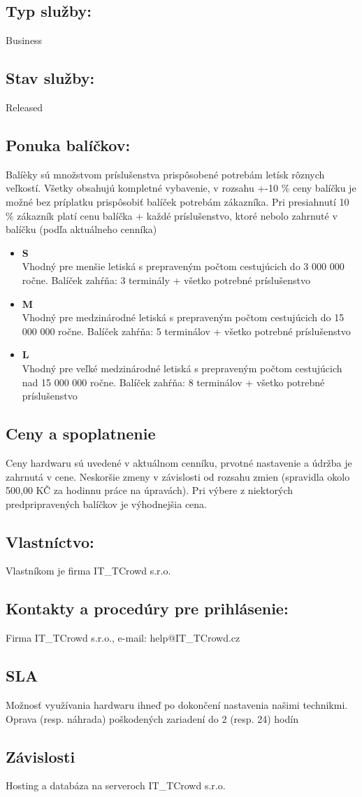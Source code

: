 \documentclass[a4paper, 11pt]{article}
\begin{document}
\subsection*{Typ služby:}
Business
\subsection*{Stav služby:}
Released
\subsection*{Ponuka balíčkov:}
Balíèky sú množstvom príslušenstva prispôsobené potrebám letísk rôznych veľkostí. Všetky obsahujú kompletné vybavenie, v rozsahu +-10 \% ceny balíčku je možné bez príplatku prispôsobiť balíček potrebám zákazníka. Pri presiahnutí 10 \% zákazník platí cenu balíčka + každé príslušenstvo, ktoré nebolo zahrnuté v balíčku (podľa aktuálneho cenníka)
\begin{itemize}
\item \textbf{S} \\
Vhodný pre menšie letiská s prepraveným počtom cestujúcich do 3 000 000 ročne. Balíček zahŕňa: 3 terminály + všetko potrebné príslušenstvo
\item \textbf{M} \\
Vhodný pre medzinárodné letiská s prepraveným počtom cestujúcich do 15 000 000 ročne. Balíček zahŕňa: 5 terminálov + všetko potrebné príslušenstvo
\item \textbf{L} \\
Vhodný pre veľké medzinárodné letiská s prepraveným počtom cestujúcich nad 15 000 000 ročne. Balíček zahŕňa: 8 terminálov + všetko potrebné príslušenstvo
\end{itemize}
\subsection*{Ceny a spoplatnenie}
Ceny hardwaru sú uvedené v aktuálnom cenníku, prvotné nastavenie a údržba je zahrnutá v cene. Neskoršie zmeny v závislosti od rozsahu zmien (spravidla okolo 500,00 KČ za hodinnu práce na úpravách). Pri výbere z niektorých predpripravených balíčkov je výhodnejšia cena.
\subsection*{Vlastníctvo:}
Vlastníkom je firma IT\_TCrowd s.r.o.
\subsection*{Kontakty a procedúry pre prihlásenie:}
Firma IT\_TCrowd s.r.o., e-mail: help@IT\_TCrowd.cz
\subsection*{SLA}
Možnosť využívania hardwaru ihneď po dokončení nastavenia našimi technikmi. Oprava (resp. náhrada) poškodených zariadení do 2 (resp. 24) hodín
\subsection*{Závislosti}
Hosting a databáza na serveroch IT\_TCrowd s.r.o.

\end{document}
